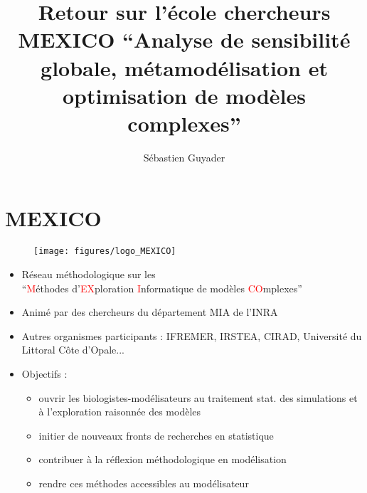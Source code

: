 \documentclass[10pt]{beamer}
\title{Retour sur l'école chercheurs MEXICO \enquote{Analyse de sensibilité globale, métamodélisation et optimisation de modèles complexes}}
\author{Sébastien Guyader}
\begin{document}
\begin{frame}
  \titlepage
\end{frame}

\section{MEXICO}

\begin{frame}{}

\begin{figure}
	\centering
	\texttt{[image: figures/logo\_MEXICO]}
\end{figure}

\begin{itemize}
	\item Réseau méthodologique sur les\\
	\enquote{\textcolor{red}{M}éthodes d'\textcolor{red}{EX}ploration \textcolor{red}{I}nformatique de modèles \textcolor{red}{CO}mplexes}
	\item Animé par des chercheurs du département MIA de l'INRA
	\item Autres organismes participants : IFREMER, IRSTEA, CIRAD, Université du Littoral Côte d'Opale...
	\item Objectifs :
	\begin{itemize}
		\item ouvrir les biologistes-modélisateurs au traitement stat. des simulations et à l'exploration raisonnée des modèles
		\item initier de nouveaux fronts de recherches en statistique
		\item contribuer à la réflexion méthodologique en modélisation
		\item rendre ces méthodes accessibles au modélisateur		
	\end{itemize} 
\end{itemize} 

\end{frame}
\end{document}
